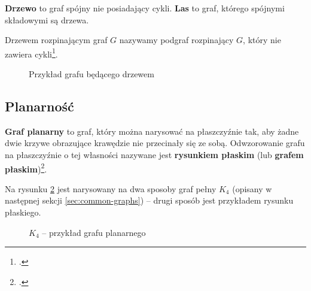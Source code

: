 \textbf{Drzewo} to graf spójny nie posiadający cykli. \textbf{Las} to graf, którego spójnymi składowymi są drzewa.

Drzewem rozpinającym graf $G$ nazywamy podgraf rozpinający $G$, który nie zawiera cykli\footcite[10]{wilson-beineke}. 

\begin{figure}[h]
\centering
{}
\caption{Przykład grafu będącego drzewem} \label{fig:tree-example}
\end{figure}

\subsection*{Planarność}

\textbf{Graf planarny} to graf, który można narysować na płaszczyźnie tak, aby żadne dwie krzywe obrazujące krawędzie nie przecinały się ze sobą. Odwzorowanie grafu na płaszczyźnie o tej własności nazywane jest \textbf{rysunkiem płaskim} (lub \textbf{grafem płaskim})\footcite[82]{wilson}. 

Na rysunku \ref{fig:planar-graph-example} jest narysowany na dwa sposoby graf pełny $K_4$ (opisany w następnej sekcji \ref{sec:common-graphs}) -- drugi sposób jest przykładem rysunku płaskiego. 

\begin{figure}[h]
\centering
{}
\caption{$K_4$ -- przykład grafu planarnego} \label{fig:planar-graph-example}
\end{figure}